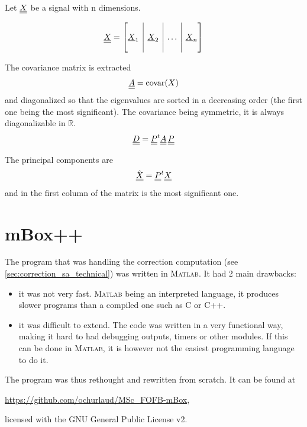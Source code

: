 Let $\underline{\underline{X}}$ be a signal with n dimensions.

\begin{equation}
\mat{X} = \left[
\begin{array}{@{}c|c|c|c@{}}
&&&\\ \vec{X}_1 & \vec{X}_2 & \dots & \vec{X}_n \\ &&&
\end{array}
\right]
\end{equation}

The covariance matrix is extracted
\begin{equation}
\underline{\underline{A}} = \text{covar}(X)
\end{equation}
and diagonalized so that the eigenvalues are sorted in a decreasing order (the first one being the most significant). The covariance being symmetric, it is always diagonalizable in $\mathbb{R}$.
\begin{equation}
\underline{\underline{D}} = \underline{\underline{P}}^{t} \underline{\underline{A}} \, \underline{\underline{P}}
\end{equation}

The principal components are
\begin{equation}
\hat{\underline{\underline{X}}} = \underline{\underline{P}}^{t} \underline{\underline{X}}
\end{equation}
and in the first column of the matrix is the most significant one.

\chapter{mBox++}
\label{apx:mbox}
The program that was handling the correction computation (see \cref{sec:correction_sa_technical}) was written in \textsc{Matlab}. It had 2 main drawbacks:
\begin{itemize}
    \item it was not very fast. \textsc{Matlab} being an interpreted language, it produces slower programs than a compiled one such as C or C++.
    \item it was difficult to extend. The code was written in a very functional way, making it hard to had debugging outputs, timers or other modules. If this can be done in \textsc{Matlab}, it is however not the easiest programming language to do it.
\end{itemize}

The program was thus rethought and rewritten from scratch. It can be found at
\begin{center}
    \url{https://github.com/ochurlaud/MSc_FOFB-mBox},
\end{center} 
licensed with the GNU General Public License v2.

